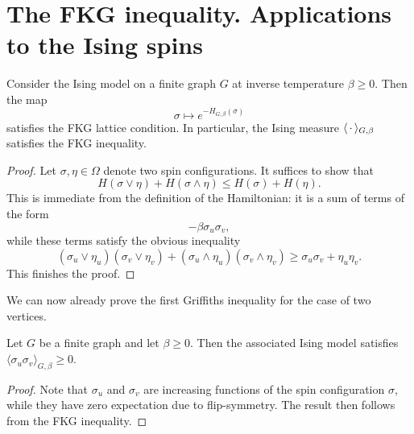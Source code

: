 \section{The FKG inequality. Applications to the Ising spins}

\begin{lemma}
    Consider the Ising model on a finite graph $G$ at inverse
    temperature $\beta\geq 0$.
    Then the map
    \[
        \sigma\mapsto e^{-H_{G,\beta}(\sigma)}
    \]
    satisfies the FKG lattice condition.
    In particular, the Ising measure
    $\langle\,\cdot\,\rangle_{G,\beta}$ satisfies the FKG inequality.
\end{lemma}

\begin{proof}
    Let $\sigma,\eta\in\Omega$ denote two spin configurations.
    It suffices to show that
    \[
        H(\sigma\vee\eta)+H(\sigma\wedge\eta)
        \leq
        H(\sigma)+H(\eta).
    \]
    This is immediate from the definition of the Hamiltonian:
    it is a sum of terms of the form
    \[
        -\beta\sigma_u\sigma_v,
    \]
    while these terms satisfy the obvious inequality
    \[
        (\sigma_u\vee \eta_u)(\sigma_v\vee \eta_v)
        +
        (\sigma_u\wedge \eta_u)(\sigma_v\wedge \eta_v)
        \geq
        \sigma_u\sigma_v+\eta_u\eta_v.
    \]
    This finishes the proof.
\end{proof}

We can now already prove the first Griffiths inequality for the case of
two vertices.

\begin{corollary}
    Let $G$ be a finite graph and let $\beta\geq 0$.
    Then the associated Ising model satisfies $\langle\sigma_u\sigma_v\rangle_{G,\beta}\geq 0$.
\end{corollary}

\begin{proof}
    Note that $\sigma_u$ and $\sigma_v$ are increasing functions
    of the spin configuration $\sigma$,
    while they have zero expectation due to flip-symmetry.
    The result then follows from the FKG inequality.
\end{proof}
